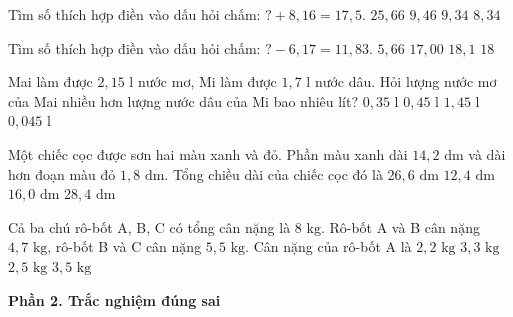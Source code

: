 \begin{ex} %
Tìm số thích hợp điền vào dấu hỏi chấm: $? + 8{,}16 = 17{,}5$.
\choice
{$25{,}66$}
{$9{,}46$}
{\True $9{,}34$}
{$8{,}34$}
\end{ex}

\begin{ex} %
Tìm số thích hợp điền vào dấu hỏi chấm: $? - 6{,}17 = 11{,}83$.
\choice
{$5{,}66$}
{$17{,}00$}
{$18{,}1$}
{\True $18$}
\end{ex}

\begin{ex} %
Mai làm được $2{,}15\text{ l}$ nước mơ, Mi làm được $1{,}7\text{ l}$ nước dâu. Hỏi lượng nước mơ của Mai nhiều hơn lượng nước dâu của Mi bao nhiêu lít?
\choice
{$0{,}35\text{ l}$}
{\True $0{,}45\text{ l}$}
{$1{,}45\text{ l}$}
{$0{,}045\text{ l}$}
\end{ex}

\begin{ex} %
Một chiếc cọc được sơn hai màu xanh và đỏ. Phần màu xanh dài $14{,}2\text{ dm}$ và dài hơn đoạn màu đỏ $1{,}8\text{ dm}$. Tổng chiều dài của chiếc cọc đó là
\choice
{\True $26{,}6\text{ dm}$}
{$12{,}4\text{ dm}$}
{$16{,}0\text{ dm}$}
{$28{,}4\text{ dm}$}
\end{ex}

\begin{ex} %
Cả ba chú rô-bốt A, B, C có tổng cân nặng là $8\text{ kg}$. Rô-bốt A và B cân nặng $4{,}7\text{ kg}$, rô-bốt B và C cân nặng $5{,}5\text{ kg}$. Cân nặng của rô-bốt A là
\choice
{$2{,}2\text{ kg}$}
{$3{,}3\text{ kg}$}
{\True $2{,}5\text{ kg}$}
{$3{,}5\text{ kg}$}
\end{ex}

\textbf{Phần 2. Trắc nghiệm đúng sai}

